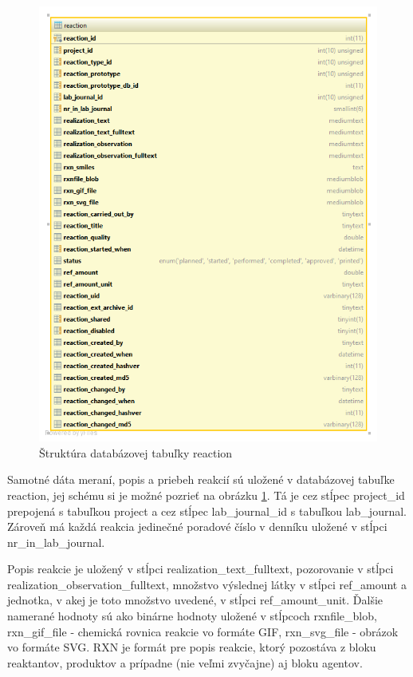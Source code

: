\documentclass[thesis=M,slovak]{FITthesis}[2013/05/06]
\begin{document}
\begin{figure}\centering
	\includegraphics[width=1.0\textwidth]{Schema_DB_Open_Enventory/reaction.png}
 	\caption[Štruktúra databázovej tabuľky reaction]{Štruktúra databázovej tabuľky reaction}\label{graphics:reaction}
\end{figure}

Samotné dáta meraní, popis a priebeh reakcií sú uložené v databázovej tabuľke reaction, jej schému si je možné pozrieť na obrázku \ref{graphics:reaction}. Tá je cez stĺpec project\_id prepojená s tabuľkou project a cez stĺpec lab\_journal\_id s tabuľkou lab\_journal. Zároveň má každá reakcia jedinečné poradové číslo v denníku uložené v stĺpci nr\_in\_lab\_journal.

Popis reakcie je uložený v stĺpci realization\_text\_fulltext, pozorovanie v stĺpci realization\_observation\_fulltext, množstvo výslednej látky v stĺpci ref\_amount a jednotka, v akej je toto množstvo uvedené, v stĺpci ref\_amount\_unit. Ďalšie namerané hodnoty sú ako binárne hodnoty uložené v stĺpcoch rxnfile\_blob, rxn\_gif\_file - chemická rovnica reakcie vo formáte GIF, rxn\_svg\_file - obrázok vo formáte SVG. RXN je formát pre popis reakcie, ktorý pozostáva z bloku reaktantov, produktov a prípadne (nie veľmi zvyčajne) aj bloku agentov.
\end{document}
